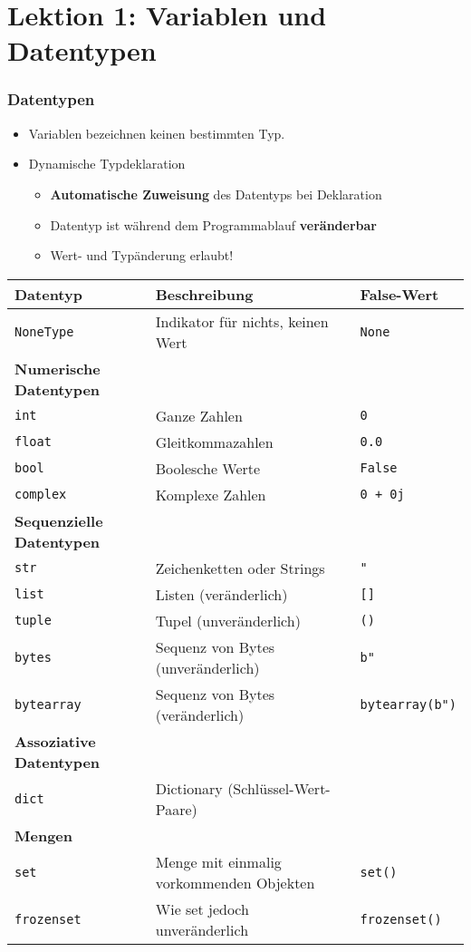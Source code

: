 \part*{Lektion 1: Variablen und Datentypen}
\section{Datentypen}
\begin{itemize}
	\item Variablen bezeichnen keinen bestimmten Typ.
	\item Dynamische Typdeklaration
	\begin{itemize}
		\item \textbf{Automatische Zuweisung} des Datentyps bei Deklaration
		\item Datentyp ist während dem Programmablauf \textbf{veränderbar}
		\item Wert- und Typänderung erlaubt!
	\end{itemize}
\end{itemize}
\begin{tabular}{|l|l|l|}
	\hline 
	\textbf{Datentyp} &\textbf{Beschreibung} &\textbf{False-Wert}\\
	\hline
	\texttt{NoneType} &Indikator für nichts, keinen Wert &\texttt{None}\\ 
	\hline
	\textbf{Numerische Datentypen}&&\\
	\texttt{int} &Ganze Zahlen &\texttt{0}\\ 
	\texttt{float} &Gleitkommazahlen &\texttt{0.0}\\ 
	\texttt{bool} &Boolesche Werte &\texttt{False}\\ 
	\texttt{complex} &Komplexe Zahlen &\texttt{0 + 0j}\\ 
	\hline 
	\textbf{Sequenzielle Datentypen}&&\\
	\texttt{str} &Zeichenketten oder Strings &\texttt{"}\\
	\texttt{list} &Listen (veränderlich) &\texttt{[]}\\
	\texttt{tuple} &Tupel (unveränderlich) &\texttt{()}\\
	\texttt{bytes} &Sequenz von Bytes (unveränderlich) &\texttt{b"}\\
	\texttt{bytearray} &Sequenz von Bytes (veränderlich) &\texttt{bytearray(b")}\\
	\hline
	\textbf{Assoziative Datentypen}&&\\
	\texttt{dict} &Dictionary (Schlüssel-Wert-Paare) &\texttt{{}}\\
	\hline
	\textbf{Mengen}&&\\
	\texttt{set} &Menge mit einmalig vorkommenden Objekten &\texttt{set()}\\
	\texttt{frozenset} &Wie set jedoch unveränderlich &\texttt{frozenset()}\\
	\hline
\end{tabular}\\
